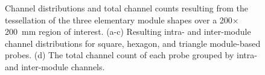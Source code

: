 \begin{figure}
\begin{center}
\end{center}
\caption {Channel distributions and total channel counts resulting from the tessellation of the three elementary module shapes over a 200$\times$200~mm region of interest. (a-c) Resulting intra- and inter-module channel distributions for square, hexagon, and triangle module-based probes. (d) The total channel count of each probe grouped by intra- and inter-module channels.} \label{fig:fullchannels}


\end{figure}
